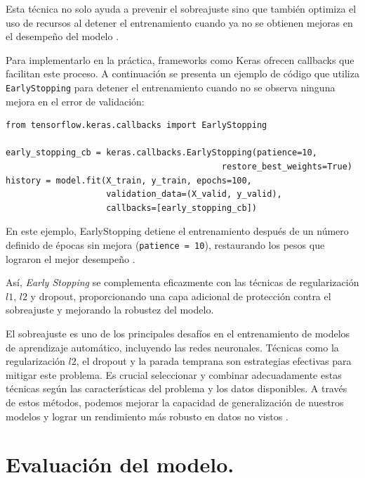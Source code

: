 Esta técnica no solo ayuda a prevenir el sobreajuste sino que también optimiza el uso de recursos al detener el entrenamiento cuando ya no se obtienen mejoras en el desempeño del modelo \citep{tian2022comprehensive}.

Para implementarlo en la práctica, frameworks como Keras ofrecen callbacks que facilitan este proceso. A continuación se presenta un ejemplo de código que utiliza \lstinline|EarlyStopping| para detener el entrenamiento cuando no se observa ninguna mejora en el error de validación:


\lstset{language=Python}
\begin{lstlisting}
from tensorflow.keras.callbacks import EarlyStopping

early_stopping_cb = keras.callbacks.EarlyStopping(patience=10,
                                           restore_best_weights=True)
history = model.fit(X_train, y_train, epochs=100,
                    validation_data=(X_valid, y_valid),
                    callbacks=[early_stopping_cb])
\end{lstlisting}

En este ejemplo, EarlyStopping detiene el entrenamiento después de un número definido de épocas sin mejora (\lstinline|patience = 10|), restaurando los pesos que lograron el mejor desempeño \citep{geron2022hands}.

Así, \textit{Early Stopping} se complementa eficazmente con las técnicas de regularización $l1$, $l2$ y dropout, proporcionando una capa adicional de protección contra el sobreajuste y mejorando la robustez del modelo.

\bigskip


El sobreajuste es uno de los principales desafíos en el entrenamiento de modelos de aprendizaje automático, incluyendo las redes neuronales. Técnicas como la regularización \(l2\), el dropout y la parada temprana son estrategias efectivas para mitigar este problema. Es crucial seleccionar y combinar adecuadamente estas técnicas según las características del problema y los datos disponibles. A través de estos métodos, podemos mejorar la capacidad de generalización de nuestros modelos y lograr un rendimiento más robusto en datos no vistos \citep{geron2022hands, pajares2021aprendizaje}.












\section{Evaluación del modelo.} 

